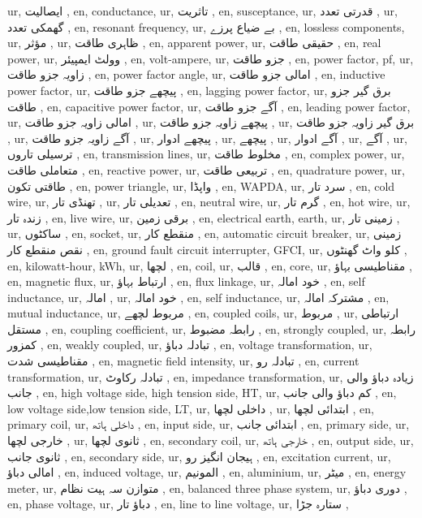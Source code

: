 ur, ایصالیت ,
en, conductance,
ur, تاثریت ,
en, susceptance,
ur, قدرتی تعدد ,
ur, گھمکی تعدد ,
en, resonant frequency,
ur, بے ضیاع پرزے ,
en, lossless components,
ur, مؤثر ,
ur, ظاہری طاقت ,
en, apparent power,
ur, حقیقی طاقت ,
en, real power,
ur, وولٹ ایمپیئر ,
en, volt-ampere,
ur, جزو طاقت ,
en, power factor, pf,
ur, زاویہ جزو طاقت ,
en, power factor angle,
ur, امالی جزو طاقت ,
en, inductive power factor,
ur, پیچھے جزو طاقت ,
en, lagging power factor,
ur, برق گیر جزو طاقت ,
en, capacitive power factor,
ur, آگے جزو طاقت ,
en, leading power factor,
ur, امالی زاویہ جزو طاقت ,
ur, پیچھے زاویہ جزو طاقت ,
ur, برق گیر زاویہ جزو طاقت ,
ur, آگے زاویہ جزو طاقت ,
ur, پیچھے ادوار ,
ur, پیچھے ,
ur, آگے ادوار ,
ur, آگے ,
ur, ترسیلی تاروں ,
en, transmission lines,
ur, مخلوط طاقت ,
en, complex power,
ur, متعاملی طاقت ,
en, reactive power,
ur, تربیعی طاقت ,
en, quadrature power,
ur, طاقتی تکون ,
en, power triangle,
ur, واپڈا ,
en, WAPDA,
ur, سرد تار ,
en, cold wire,
ur, تھنڈی تار ,
ur, تعدیلی تار ,
en, neutral wire,
ur, گرم تار ,
en, hot wire,
ur, زندہ تار ,
en, live wire,
ur, برقی زمین ,
en, electrical earth, earth,
ur, زمینی تار ,
ur, ساکٹوں ,
en, socket,
ur, منقطع کار ,
en, automatic circuit breaker,
ur, زمینی نقص منقطع کار ,
en, ground fault circuit interrupter, GFCI,
ur, کلو واٹ گھنٹوں ,
en, kilowatt-hour, kWh,
ur, لچھا ,
en, coil,
ur, قالب ,
en, core,
ur, مقناطیسی بہاؤ ,
en, magnetic flux,
ur, ارتباط بہاؤ ,
en, flux linkage,
ur, خود امالہ ,
en, self inductance,
ur, امالہ ,
ur, خود امالہ ,
en, self inductance,
ur, مشترکہ امالہ ,
en, mutual inductance,
ur, مربوط لچھے ,
en, coupled coils,
ur, مربوط ,
ur, ارتباطی مستقل ,
en, coupling coefficient,
ur, رابطہ مضبوط ,
en, strongly coupled,
ur, رابطہ کمزور ,
en, weakly coupled,
ur, تبادلہ دباؤ ,
en, voltage transformation,
ur, مقناطیسی شدت ,
en, magnetic field intensity,
ur, تبادلہ رو ,
en, current transformation,
ur, تبادلہ رکاوٹ ,
en, impedance transformation,
ur, زیادہ دباؤ والی جانب ,
en, high voltage side, high tension side, HT,
ur, کم دباؤ والی جانب ,
en, low voltage side,low tension side, LT,
ur, داخلی لچھا ,
ur, ابتدائی لچھا ,
en, primary coil,
ur, داخلی ہاتھ ,
en, input side,
ur, ابتدائی جانب ,
en, primary side,
ur, خارجی لچھا ,
ur, ثانوی لچھا ,
en, secondary coil,
ur, خارجی ہاتھ ,
en, output side,
ur, ثانوی جانب ,
en, secondary side,
ur, ہیجان انگیز رو ,
en, excitation current,
ur, امالی دباؤ ,
en, induced voltage,
ur, المونیم ,
en, aluminium,
ur, میٹر ,
en, energy meter,
ur, متوازن سہ ہیت نظام ,
en, balanced three phase system,
ur, دوری دباؤ ,
en, phase voltage,
ur, دباؤ تار ,
en, line to line voltage,
ur, ستارہ جڑا ,
